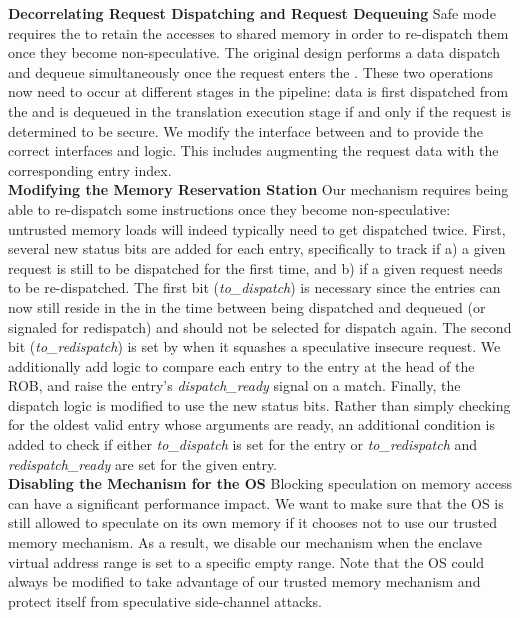 \noindent\textbf{Decorrelating Request Dispatching and Request Dequeuing}
Safe mode requires the \MemRS{} to retain the accesses to shared memory in order to re-dispatch them once they become non-speculative.
The original design performs a \MemRS{} data dispatch and dequeue simultaneously once the request enters the \MemExePipeline{}. 
These two operations now need to occur at different stages in the pipeline: data is first dispatched from the \MemRS{} and is dequeued in the translation execution stage if and only if the request is determined to be secure. 
We modify the interface between \MemRS{} and \MemExePipeline{} to provide the correct interfaces and logic.
This includes augmenting the request data with the corresponding \MemRS{} entry index.
\\

\noindent\textbf{Modifying the Memory Reservation Station}
Our mechanism requires \MemRS{} being able to re-dispatch some instructions once they become non-speculative: untrusted memory loads will indeed typically need to get dispatched twice.
First, several new status bits are added for each \MemRS{} entry, specifically to track if a) a given request is still to be dispatched for the first time, and b) if a given request needs to be re-dispatched. 
The first bit (\textit{to\_dispatch}) is necessary since the entries can now still reside in the \MemRS{} in the time between being dispatched and dequeued (or signaled for redispatch) and should not be selected for dispatch again.
The second bit (\textit{to\_redispatch}) is set by \MemExePipeline{} when it squashes a speculative insecure request. 
We additionally add logic to compare each \MemRS{} entry to the entry at the head of the ROB, and raise the entry's \textit{dispatch\_ready} signal on a match.
Finally, the dispatch logic is modified to use the new status bits. Rather than simply checking for the oldest valid entry whose arguments are ready, an additional condition is added to check if either \textit{to\_dispatch} is set for the entry or \textit{to\_redispatch} and \textit{redispatch\_ready} are set for the given entry.
\\

\noindent\textbf{Disabling the Mechanism for the OS}
Blocking speculation on memory access can have a significant performance impact.
We want to make sure that the OS is still allowed to speculate on its own memory if it chooses not to use our trusted memory mechanism.
As a result, we disable our mechanism when the enclave virtual address range is set to a specific empty range.
Note that the OS could always be modified to take advantage of our trusted memory mechanism and protect itself from speculative side-channel attacks.

